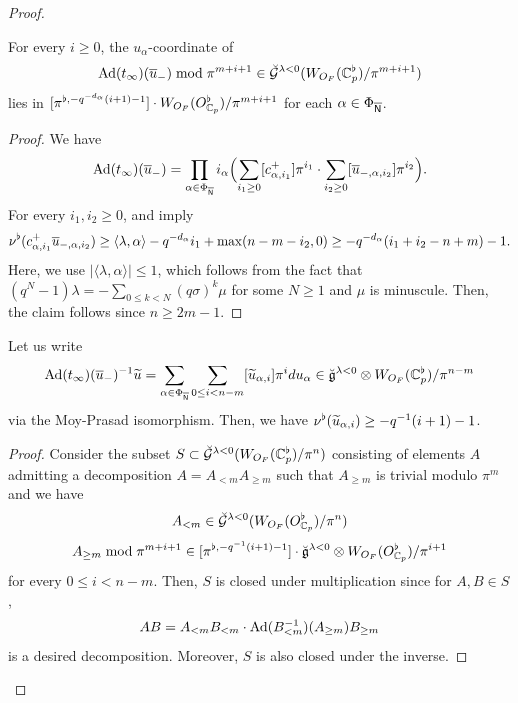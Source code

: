 \documentclass[12pt,reqno]{amsart}
\begin{document}
\begin{proof}
\begin{lem} \label{lem:coefmodm+i+1}
    For every $i \geq 0$, the $u_\alpha$-coordinate of
    \[
        {\operatorname{Ad}}(t_\infty)({\overline{u}}_-) \bmod{\pi^{m + i + 1}} \in \breve{{\mathcal{G}}}^{\lambda < 0}(W_{O_F}(\mathbb{C}_p^\flat) / \pi^{m + i +1})
    \]
    lies in $[\pi^{\flat, - q^{-d_\alpha}(i + 1) - 1}] \cdot W_{O_F}(O_{\mathbb{C}_p}^\flat) / \pi^{m + i +1}$ for each $\alpha \in \Phi_{{\mathsf{{\overline{N}}}}}$. 
\end{lem}
\begin{proof}
    We have 
    \[
        {\operatorname{Ad}}(t_\infty)({\overline{u}}_-) = \prod_{\alpha \in \Phi_{{\overline{{\mathsf{N}}}}}} i_{\alpha}\Bigl(\sum_{i_1 \geq 0} [c_{\alpha, i_1}^{+}] \pi^{i_1} \cdot \sum_{i_2 \geq 0} [{\overline{u}}_{-, \alpha, i_2}]\pi^{i_2} \Bigr). 
    \]
    For every $i_1, i_2 \geq 0$,  and  imply
    \[
        \nu^\flat(c_{\alpha, i_1}^+ {\overline{u}}_{-, \alpha, i_2}) \geq \langle \lambda, \alpha \rangle - q^{-d_\alpha} i_1 + \max(n - m - i_2, 0) \geq - q^{-d_\alpha} (i_1 + i_2 - n + m) - 1. 
    \]
    Here, we use $\lvert  \langle \lambda, \alpha \rangle \rvert \leq 1$, which follows from the fact that $(q^N - 1)\lambda = - \sum_{0 \leq k < N} (q\sigma)^k\mu$ for some $N\geq 1$ and $\mu$ is minuscule. Then, the claim follows since $n \geq 2m - 1$. 
\end{proof}

\begin{cor} \label{cor:valuation_last_step}
    Let us write 
    \[
        {\operatorname{Ad}}(t_\infty)({\overline{u}}_-)^{-1} {\widetilde{u}} = \sum_{\alpha \in \Phi_{{\mathsf{{\overline{N}}}}}} \sum_{0 \leq i < n - m} [{\widetilde{u}}_{\alpha,i}] \pi^i du_\alpha \in {\mathfrak{\breve{g}}}^{\lambda < 0} \otimes W_{O_F}(\mathbb{C}_p^\flat)/\pi^{n-m}
    \]
    via the Moy-Prasad isomorphism. Then, we have $\nu^\flat({\widetilde{u}}_{\alpha, i}) \geq - q^{-1}(i + 1) - 1$.
\end{cor}
\begin{proof}
    Consider the subset $S \subset {\mathcal{\breve{G}}}^{\lambda < 0}(W_{O_F}(\mathbb{C}_p^\flat) / \pi^n)$ consisting of elements $A$ admitting a decomposition $A = A_{<m} A_{\geq m}$ such that $A_{\geq m}$ is trivial modulo $\pi^m$ and we have 
    \[
        A_{<m} \in {\mathcal{\breve{G}}}^{\lambda < 0}(W_{O_F}(O_{\mathbb{C}_p}^\flat) / \pi^n)
    \]
    \[
        A_{\geq m} \bmod{\pi^{m + i +1}} \in [\pi^{\flat, - q^{-1}(i + 1) - 1}]\cdot {\mathfrak{\breve{g}}}^{\lambda < 0} \otimes W_{O_F}(O_{\mathbb{C}_p}^\flat)/\pi^{i + 1}
    \]
    for every $0 \leq i < n-m$. %
    Then, $S$ is closed under multiplication since for $A , B \in S$, 
    \[
        AB = A_{<m} B_{<m} \cdot {\operatorname{Ad}}(B_{<m}^{-1})(A_{\geq m}) B_{\geq m}
    \]
    is a desired decomposition. Moreover, $S$ is also closed under the inverse. 


\end{proof}
\end{proof}
\end{document}
